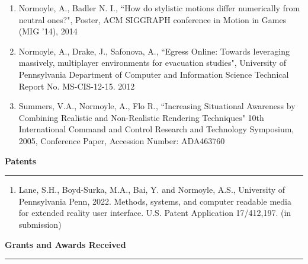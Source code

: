 \begin{enumerate}[leftmargin=*]
\item Normoyle, A., Badler N. I., ``How do stylistic motions differ numerically from neutral ones?", Poster, ACM SIGGRAPH conference in Motion in Games (MIG '14), 2014

\item Normoyle, A., Drake, J., Safonova, A., ``Egress Online: Towards leveraging massively, multiplayer environments for evacuation studies", University of Pennsylvania Department of Computer and Information Science Technical Report No. MS-CIS-12-15. 2012

\item Summers, V.A., Normoyle, A., Flo R., ``Increasing Situational Awareness by Combining Realistic and Non-Realistic Rendering Techniques" 10th International Command and Control Research and Technology Symposium, 2005, Conference Paper,  Accession Number: ADA463760 
\end{enumerate}

\medskip
\medskip

{\Large {\bf Patents}}
\vspace{0.1cm}
\hrule
\medskip

\begin{enumerate}[leftmargin=*]
  \item  Lane, S.H., Boyd-Surka, M.A., Bai, Y. and Normoyle, A.S., University of Pennsylvania Penn, 2022. Methods, systems, and computer readable media for extended reality user interface. U.S. Patent Application 17/412,197. (in submission)
\end{enumerate}

\medskip
\medskip

{\Large {\bf Grants and Awards Received}}
\vspace{0.1cm}
\hrule
\medskip

